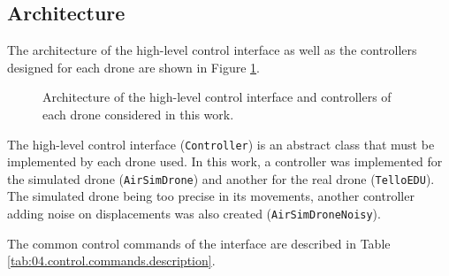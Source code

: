 \subsection{Architecture}

The architecture of the high-level control interface as well as the controllers designed for each drone are shown in Figure \ref{fig:04.control.interface.architecture}.

\begin{figure}[H]
    \centering
    \caption{Architecture of the high-level control interface and controllers of each drone considered in this work.}
    \label{fig:04.control.interface.architecture}
\end{figure}

The high-level control interface (\texttt{Controller}) is an abstract class that must be implemented by each drone used. In this work, a controller was implemented for the simulated drone (\texttt{AirSimDrone}) and another for the real drone (\texttt{TelloEDU}). The simulated drone being too precise in its movements, another controller adding noise on displacements was also created (\texttt{AirSimDroneNoisy}).

The common control commands of the interface are described in Table \ref{tab:04.control.commands.description}.

